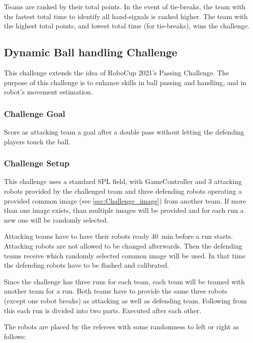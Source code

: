         Teams are ranked by their total points. In the event of tie-breaks, the team with the fastest total time to identify all hand-signals is ranked higher. The team with the highest total points, and lowest total time (for tie-breaks), wins the challenge. 

\subsection{Dynamic Ball handling Challenge}

    This challenge extends the idea of RoboCup 2021's Passing Challenge. The purpose of this challenge is to enhance skills in ball passing and handling, and in robot's movement estimation.

    \subsubsection{Challenge Goal}

        Score as attacking team a goal after a double pass without letting the defending players touch the ball.

    \subsubsection{Challenge Setup}

        This challenge uses a standard SPL field, with GameController and 3 attacking robots provided by the challenged team and three defending robots operating a provided common image (see \cref{sec:Challenge_image}) from another team. If more than one image exists, than multiple images will be provided and for each run a new one will be randomly selected.

        Attacking teams have to have their robots ready \qty{40}{\minute} before a run starts. Attacking robots are not allowed to be changed afterwards. Then the defending teams receive which randomly selected common image will be used. In that time the defending robots have to be flashed and calibrated.

        Since the challenge has three runs for each team, each team will be teamed with another team for a run. Both teams have to provide the same three robots (except one robot breaks) as attacking as well as defending team. Following from this each run is divided into two parts. Executed after each other.

        The robots are placed by the referees with some randomness to left or right as follows:

